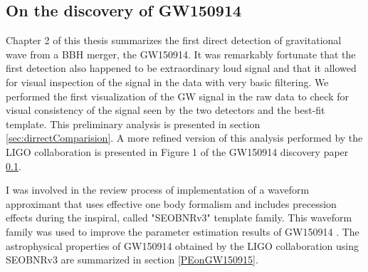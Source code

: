 \subsection{On the discovery of GW150914}
Chapter 2 of this thesis summarizes the first direct detection of gravitational wave from a BBH merger, the GW150914.  It was remarkably fortunate that the first detection also happened to be extraordinary loud signal and that it allowed for visual inspection of the signal in the data with very basic filtering. 
We performed the first visualization of the GW signal in the raw data to check for visual consistency of the signal seen by the two detectors and the best-fit template. This preliminary analysis is presented in section \ref{sec:dirrectComparision}. A more refined version of this analysis performed by the LIGO collaboration is presented in Figure 1 of the GW150914 discovery paper \ref{}.  

I was involved in the review process of implementation of a waveform approximant that uses effective one body formalism and includes precession effects during the inspiral, called "SEOBNRv3" template family. This waveform family was used to improve the parameter estimation results of GW150914 \cite{}. The astrophysical properties of GW150914 obtained by the LIGO collaboration using SEOBNRv3 are summarized in section \ref{PEonGW150915}.   




